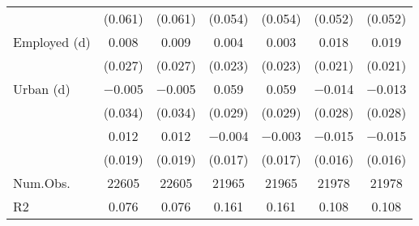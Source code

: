 \begin{table}
\begin{tabular}[t]{lcccccc}
 & (\num{0.061}) & (\num{0.061}) & (\num{0.054}) & (\num{0.054}) & (\num{0.052}) & (\num{0.052})\\
Employed (d) & \num{0.008} & \num{0.009} & \num{0.004} & \num{0.003} & \num{0.018} & \num{0.019}\\
 & (\num{0.027}) & (\num{0.027}) & (\num{0.023}) & (\num{0.023}) & (\num{0.021}) & (\num{0.021})\\
Urban (d) & \num{-0.005} & \num{-0.005} & \num{0.059} & \num{0.059} & \num{-0.014} & \num{-0.013}\\
 & (\num{0.034}) & (\num{0.034}) & (\num{0.029}) & (\num{0.029}) & (\num{0.028}) & (\num{0.028})\\
 & \num{0.012} & \num{0.012} & \num{-0.004} & \num{-0.003} & \num{-0.015} & \num{-0.015}\\
 & (\num{0.019}) & (\num{0.019}) & (\num{0.017}) & (\num{0.017}) & (\num{0.016}) & (\num{0.016})\\
\midrule
Num.Obs. & \num{22605} & \num{22605} & \num{21965} & \num{21965} & \num{21978} & \num{21978}\\
R2 & \num{0.076} & \num{0.076} & \num{0.161} & \num{0.161} & \num{0.108} & \num{0.108}\\
\bottomrule
\end{tabular}
\end{table}